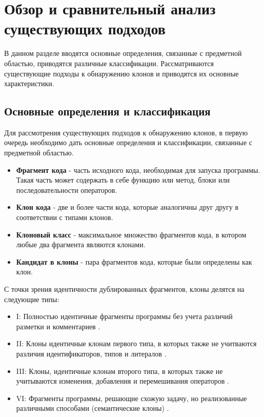 \chapter{Обзор и сравнительный анализ существующих подходов}
В данном разделе вводятся основные определения, связанные с предметной областью, приводятся различные классификации. Рассматриваются существующие подходы к обнаружению клонов и приводятся их основные характеристики.
\section{Основные определения и классификация}

Для рассмотрения существующих подходов к обнаружению клонов, в первую очередь необходимо дать основные определения и классификации, связанные с предметной областью. 

\begin{itemize}
\item \textbf{Фрагмент кода} - часть исходного кода, необходимая для запуска программы. Такая часть может содержать в себе функцию или метод, блоки или последовательности операторов.
\item \textbf{Клон кода} - две и более части кода, которые аналогичны друг другу в соответствии с типами клонов.
\item \textbf{Клоновый класс} - максимальное множество фрагментов кода, в котором любые два фрагмента являются клонами.
\item \textbf{Кандидат в клоны} - пара фрагментов кода, которые были определены как клон.
\end{itemize}

С точки зрения идентичности дублированных фрагментов, клоны делятся на следующие типы:
\begin{itemize}
\item I: Полностью идентичные фрагменты программы без учета различий разметки и комментариев \cite{surveyroyandcordy} \cite{akhinitsykson}.
\item II: Клоны идентичные клонам первого типа, в которых также не учитваются различия идентификаторов, типов и литералов \cite{surveyroyandcordy} \cite{akhinitsykson}.
\item III: Клоны, идентичные клонам второго типа, в которых также не учитываются изменения, добавления и перемешивания операторов \cite{surveyroyandcordy} \cite{akhinitsykson}.
\item VI: Фрагменты программы, решающие схожую задачу, но реализованные различными способами (семантические клоны) \cite{surveyroyandcordy} \cite{akhinitsykson}.
\end{itemize}

